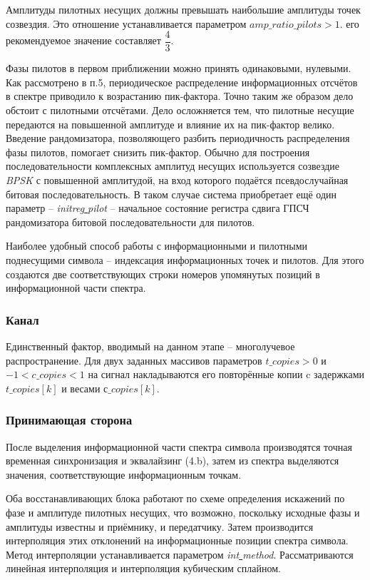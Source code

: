 Амплитуды пилотных несущих должны превышать наибольшие амплитуды точек созвездия. Это отношение устанавливается параметром $amp\_ratio\_pilots>1$. его рекомендуемое значение составляет $\dfrac{4}{3}$. 

Фазы пилотов в первом приближении можно принять одинаковыми, нулевыми. Как рассмотрено в п.5, периодическое распределение информационных отсчётов в спектре приводило к возрастанию пик-фактора. Точно таким же образом дело обстоит с пилотными отсчётами. Дело осложняется тем, что пилотные несущие передаются на повышенной амплитуде и влияние их на пик-фактор велико. Введение рандомизатора, позволяющего разбить периодичность распределения фазы пилотов, помогает снизить пик-фактор. Обычно для построения последовательности комплексных амплитуд несущих используется созвездие \textit{BPSK} с повышенной амплитудой, на вход которого подаётся псевдослучайная битовая последовательность. В таком случае система приобретает ещё один параметр -- \textit{initreg\underline{ }pilot} -- начальное состояние регистра сдвига ГПСЧ рандомизатора битовой последовательности для пилотов.

Наиболее удобный способ работы с информационными и пилотными поднесущими символа -- индексация информационных точек и пилотов. Для этого создаются две соответствующих строки номеров упомянутых позиций в информационной части спектра.

\subsubsection{Канал}

Единственный фактор, вводимый на данном этапе -- многолучевое распространение. Для двух заданных массивов параметров $t\_copies>0$ и $-1<c\_copies<1$ на сигнал накладываются его повторённые копии c задержками $t\_copies[k]$ и весами $с\_copies[k]$.

\subsubsection{Принимающая сторона}

После выделения информационной части спектра символа  производятся точная временная синхронизация и эквалайзинг (4.b), затем из спектра выделяются значения, соответствующие информационным точкам. 

Оба восстанавливающих блока работают по схеме определения искажений по фазе и амплитуде пилотных несущих, что возможно, поскольку исходные фазы и амплитуды известны и приёмнику, и передатчику. Затем производится интерполяция этих отклонений на информационные позиции спектра символа. Метод интерполяции устанавливается параметром \textit{int\underline{ }method}. Рассматриваются линейная интерполяция и интерполяция кубическим сплайном.

